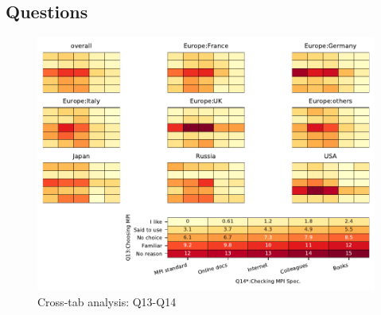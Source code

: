 
\subsection{Questions}


\begin{figure}
\begin{center}
\includegraphics[width=12cm]{../pdfs/Q13-Q14.pdf}
\caption{Cross-tab analysis: Q13-Q14}
\label{fig:Q13-Q14}
\end{center}
\end{figure}

